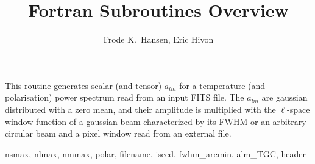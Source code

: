 
\sloppy


\title{\healpix Fortran Subroutines Overview}
 \section[create\_alm*]{ }
\label{sub:create_alm}
\author{Frode K.~Hansen, Eric Hivon}

\begin{facility}
{This routine generates scalar (and tensor) $a_{lm}$ for a temperature (and
  polarisation) power spectrum read from an input FITS
file. The $a_{lm}$ are gaussian distributed with a zero mean, and their
  amplitude is multiplied with the $\ell$-space window function of a gaussian
  beam characterized by its FWHM or an arbitrary circular beam
and a pixel window read from an external file.}
{\modAlmTools}
\end{facility}

\begin{f90format}
{nsmax, nlmax, nmmax, polar, filename, iseed, fwhm\_arcmin, alm\_TGC, header }
\end{f90format}
\aboutoptional


